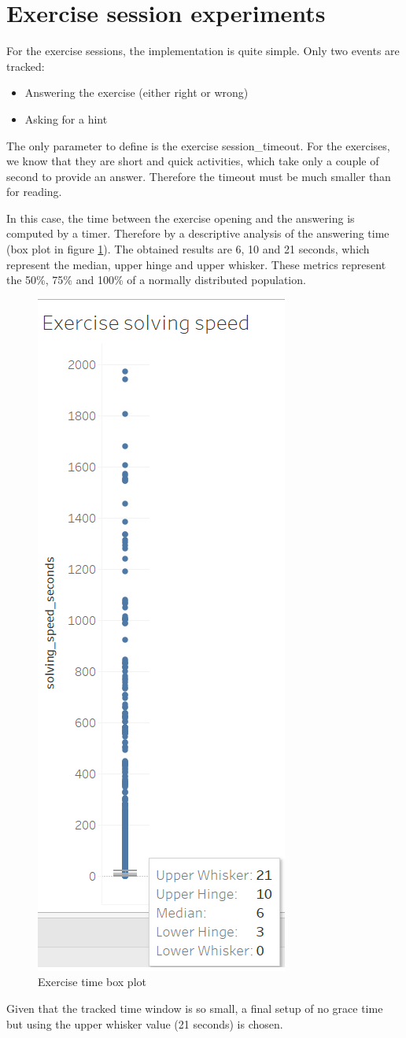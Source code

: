 \section{Exercise session experiments}
For the exercise sessions, the implementation is quite simple. Only two events are tracked:
\begin{itemize}
	\item Answering the exercise (either right or wrong)
	\item Asking for a hint
\end{itemize}

The only parameter to define is the exercise session\_timeout. For the exercises, we know that they are short and quick activities, which take only a couple of second to provide an answer. Therefore the timeout must be much smaller than for reading.

In this case, the time between the exercise opening and the answering is computed by a timer. Therefore by a descriptive analysis of the answering time (box plot in figure \ref{fig:exercise_solving_speed}). The obtained results are 6, 10 and 21 seconds, which represent the median, upper hinge and upper whisker. These metrics represent the 50\%, 75\% and 100\% of a normally distributed population. 

\begin{figure}[bth]
	\centering
	\includegraphics[width=0.2\linewidth]{gfx/exercise_solving_speed}
	\caption{Exercise time box plot}\label{fig:exercise_solving_speed}
\end{figure}

Given that the tracked time window is so small, a final setup of no grace time but using the upper whisker value (21 seconds) is chosen.


